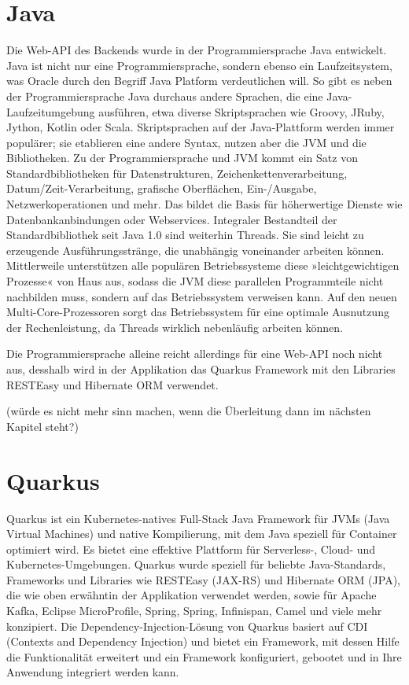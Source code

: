 \section{Java}

Die Web-API des Backends wurde in der Programmiersprache Java entwickelt.
Java ist nicht nur eine Programmiersprache, sondern ebenso ein Laufzeitsystem, was Oracle durch den Begriff Java Platform verdeutlichen will. 
So gibt es neben der Programmiersprache Java durchaus andere Sprachen, die eine Java-Laufzeitumgebung ausführen, etwa diverse Skriptsprachen wie 
Groovy, JRuby, Jython, Kotlin oder Scala. Skriptsprachen auf der Java-Plattform werden immer populärer; sie etablieren eine andere Syntax, nutzen aber die JVM und die Bibliotheken.
Zu der Programmiersprache und JVM kommt ein Satz von Standardbibliotheken für Datenstrukturen, Zeichenkettenverarbeitung, Datum/Zeit-Verarbeitung, grafische Oberflächen, 
Ein-/Ausgabe, Netzwerkoperationen und mehr. Das bildet die Basis für höherwertige Dienste wie Datenbankanbindungen oder Webservices. Integraler Bestandteil der Standardbibliothek 
seit Java 1.0 sind weiterhin Threads. Sie sind leicht zu erzeugende Ausführungsstränge, die unabhängig voneinander arbeiten können. 
Mittlerweile unterstützen alle populären Betriebssysteme diese »leichtgewichtigen Prozesse« von Haus aus, sodass die JVM diese parallelen Programmteile nicht nachbilden muss, 
sondern auf das Betriebssystem verweisen kann. Auf den neuen Multi-Core-Prozessoren sorgt das Betriebssystem für eine optimale Ausnutzung der Rechenleistung, da Threads wirklich nebenläufig arbeiten können.
\cite{sysarch-java-1}

Die Programmiersprache alleine reicht allerdings für eine Web-API noch nicht aus, desshalb wird in der Applikation das Quarkus Framework mit den 
Libraries RESTEasy und Hibernate ORM verwendet.

(würde es nicht mehr sinn machen, wenn die Überleitung dann im nächsten Kapitel steht?)


\section{Quarkus}

Quarkus ist ein Kubernetes-natives Full-Stack Java Framework für JVMs (Java Virtual Machines) und native Kompilierung, mit dem Java speziell für Container optimiert wird. 
Es bietet eine effektive Plattform für Serverless-, Cloud- und Kubernetes-Umgebungen. Quarkus wurde speziell für 
beliebte Java-Standards, Frameworks und Libraries wie RESTEasy (JAX-RS) und Hibernate ORM (JPA), die wie oben erwähntin der Applikation verwendet werden, 
sowie für Apache Kafka, Eclipse MicroProfile, Spring, Spring, Infinispan, Camel und viele mehr konzipiert.
Die Dependency-Injection-Lösung von Quarkus basiert auf CDI (Contexts and Dependency Injection) und bietet ein Framework, mit dessen Hilfe die Funktionalität 
erweitert und ein Framework konfiguriert, gebootet und in Ihre Anwendung integriert werden kann. 

